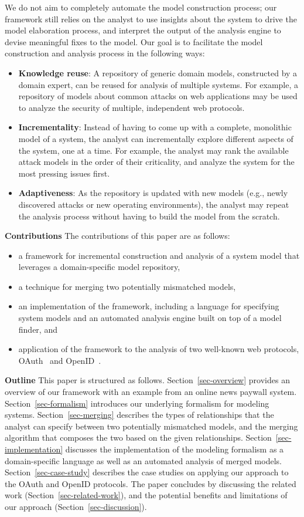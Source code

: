 We do not aim to completely automate the model construction process;
our framework still relies on the analyst to use insights about the
system to drive the model elaboration process, and interpret the
output of the analysis engine to devise meaningful fixes to the
model. Our goal is to facilitate the model construction and analysis
process in the following ways:
\begin{itemize}
\item \textbf{Knowledge reuse}: A repository of generic domain models,
  constructed by a domain expert, can be reused for analysis of
  multiple systems. For example, a repository of models about common
  attacks on web applications may be used to analyze the security of
  multiple, independent web protocols.
\item \textbf{Incrementality}: Instead of having to come up with a
  complete, monolithic model of a system, the analyst can
  incrementally explore different aspects of the system, one at a
  time. For example, the analyst may rank the available attack models
  in the order of their criticality, and analyze the system for the
  most pressing issues first.
\item \textbf{Adaptiveness}: As the repository is updated with new
  models (e.g., newly discovered attacks or new operating environments),
  the analyst may repeat the analysis process without having to build
  the model from the scratch.
\end{itemize}

\textbf{Contributions} The contributions of this paper are as
follows:
\begin{itemize}
\item a framework for incremental construction and analysis of a
  system model that leverages a domain-specific model repository,
\item a technique for merging two potentially mismatched models,
\item an implementation of the framework, including a language for
  specifying system models and an automated analysis engine built on
  top of a model finder, and
\item application of the framework to the analysis of two well-known
  web protocols, OAuth~\cite{oauth} and OpenID~\cite{openid}.
\end{itemize}

\textbf{Outline} This paper is structured as
follows. Section~\ref{sec-overview} provides an overview of our
framework with an example from an online news paywall system.
Section~\ref{sec-formalism} introduces our underlying formalism for
modeling systems. Section~\ref{sec-merging} describes the types of
relationships that the analyst can specify between two potentially
mismatched models, and the merging algorithm that composes the two
based on the given relationships. Section~\ref{sec-implementation}
discusses the implementation of the modeling formalism as a
domain-specific language as well as an automated analysis of merged
models. Section~\ref{sec-case-study} describes the case studies on
applying our approach to the OAuth and OpenID protocols. The paper
concludes by discussing the related work
(Section~\ref{sec-related-work}), and the potential benefits and
limitations of our approach (Section~\ref{sec-discussion}).

